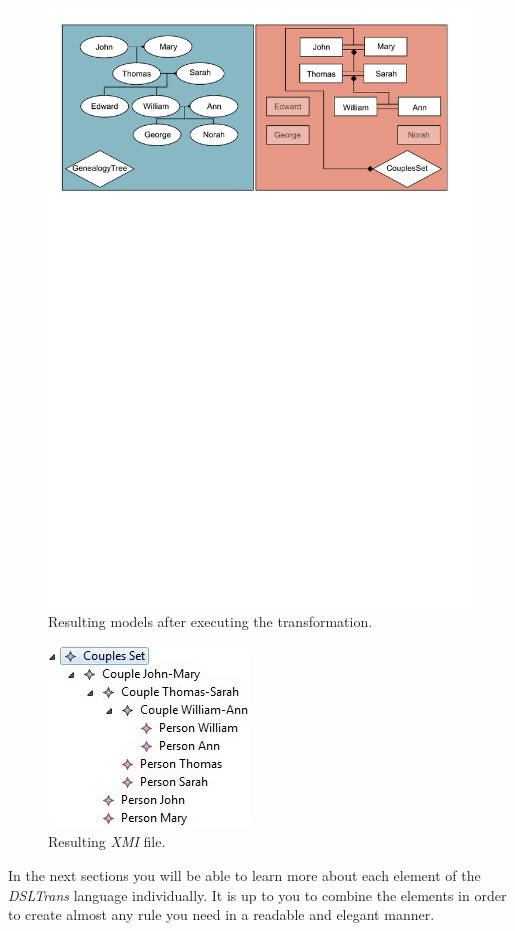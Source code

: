 \begin{figure}[h]
\begin{center}
  \includegraphics[scale=0.6, trim=0.5cm 20.4cm 1.0cm 0.6cm,
  clip]{imgs/third_layer_result.pdf}
  \caption{Resulting models after executing the transformation.}
  \label{fig:third_layer_result}
\end{center}
\end{figure}

\begin{figure}[h]
\begin{center}
  \includegraphics[scale=0.7]{imgs/third_layer_results.jpg}
  \caption{Resulting \emph{XMI} file.}
  \label{fig:third_layer_results}
\end{center}
\end{figure}

In the next sections you will be able to learn more about each element of the
\emph{DSLTrans} language individually. It is up to you to combine
the elements in order to create almost any rule you need in a readable and
elegant manner.

\clearpage